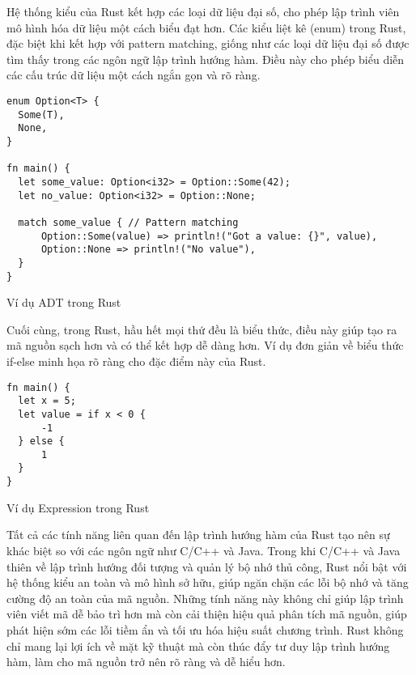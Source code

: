 Hệ thống kiểu của Rust kết hợp các loại dữ liệu đại số, cho phép lập trình viên mô hình hóa dữ liệu một cách biểu đạt hơn. Các kiểu liệt kê (enum) trong Rust, đặc biệt khi kết hợp với pattern matching, giống như các loại dữ liệu đại số được tìm thấy trong các ngôn ngữ lập trình hướng hàm. Điều này cho phép biểu diễn các cấu trúc dữ liệu một cách ngắn gọn và rõ ràng.

\begin{listing}[H]
\begin{verbatim}
enum Option<T> {
  Some(T),
  None,
}

fn main() {
  let some_value: Option<i32> = Option::Some(42);
  let no_value: Option<i32> = Option::None;

  match some_value { // Pattern matching
      Option::Some(value) => println!("Got a value: {}", value),
      Option::None => println!("No value"),
  }
}
\end{verbatim}
\caption{Ví dụ ADT trong Rust}
\label{code:fp_adt}
\end{listing}

Cuối cùng, trong Rust, hầu hết mọi thứ đều là biểu thức, điều này giúp tạo ra mã nguồn sạch hơn và có thể kết hợp dễ dàng hơn. Ví dụ đơn giản về biểu thức if-else minh họa rõ ràng cho đặc điểm này của Rust.

\begin{listing}[H]
\begin{verbatim}
fn main() {
  let x = 5;
  let value = if x < 0 {
      -1
  } else {
      1
  }
}

\end{verbatim}
\caption{Ví dụ Expression trong Rust}
\label{code:fp_expression}
\end{listing}

Tất cả các tính năng liên quan đến lập trình hướng hàm của Rust tạo nên sự khác biệt so với các ngôn ngữ như C/C++ và Java. Trong khi C/C++ và Java thiên về lập trình hướng đối tượng và quản lý bộ nhớ thủ công, Rust nổi bật với hệ thống kiểu an toàn và mô hình sở hữu, giúp ngăn chặn các lỗi bộ nhớ và tăng cường độ an toàn của mã nguồn. Những tính năng này không chỉ giúp lập trình viên viết mã dễ bảo trì hơn mà còn cải thiện hiệu quả phân tích mã nguồn, giúp phát hiện sớm các lỗi tiềm ẩn và tối ưu hóa hiệu suất chương trình. Rust không chỉ mang lại lợi ích về mặt kỹ thuật mà còn thúc đẩy tư duy lập trình hướng hàm, làm cho mã nguồn trở nên rõ ràng và dễ hiểu hơn.